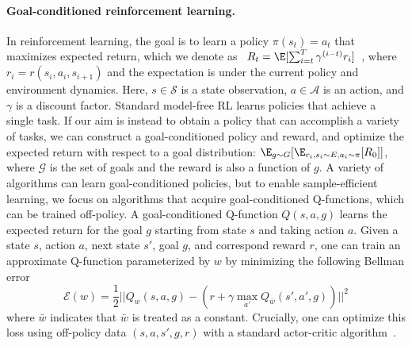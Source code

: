 \paragraph{Goal-conditioned reinforcement learning.}
In reinforcement learning, the goal is to learn a policy $\pi(s_t) = a_t$ that maximizes expected return, which we denote as 
\mbox{
$R_t = \E[ \sum_{i=t}^T \gamma^{(i - t)} r_i]$
}, 
where $r_i = r(s_i, a_i, s_{i+1})$ and the expectation is under the current policy and environment dynamics.
Here, $s \in \mathcal S$ is a state observation, $a \in \mathcal A$ is an action, and $\gamma$ is a discount factor.
Standard model-free RL learns policies that achieve a single task.
If our aim is instead to obtain a policy that can accomplish a variety of tasks, we can construct a goal-conditioned policy and reward, and optimize the expected return with respect to a goal distribution: $\E_{g \sim G} [\E_{r_i, s_i \sim E, a_i \sim \pi}[R_0]]$, where $\mathcal G$ is the set of goals and the reward is also a function of $g$.
A variety of algorithms can learn goal-conditioned policies, but to enable sample-efficient learning, we focus on algorithms that acquire goal-conditioned Q-functions, which can be trained off-policy.
A goal-conditioned Q-function $Q(s, a, g)$ learns the expected return for the goal $g$ starting from state $s$ and taking action $a$.
Given a state $s$, action $a$, next state $s'$, goal $g$, and correspond reward $r$, one can train an approximate Q-function parameterized by $w$ by minimizing the following Bellman error
\begin{equation}\label{eq:bellman}
   \mathcal E(w) = \frac{1}{2}|| Q_w(s, a, g) - (r +  \gamma \max_{a'} Q_{\bar{w}}(s', a', g))||^2
\end{equation}
where $\bar w$ indicates that $\bar w$ is treated as a constant.
Crucially, one can optimize this loss using off-policy data $(s, a, s', g, r)$ with a standard actor-critic algorithm~\citep{lillicrap2015continuous,fujimoto2018td3,mnih2016asynchronous}.

\vspace{-0.1in}
